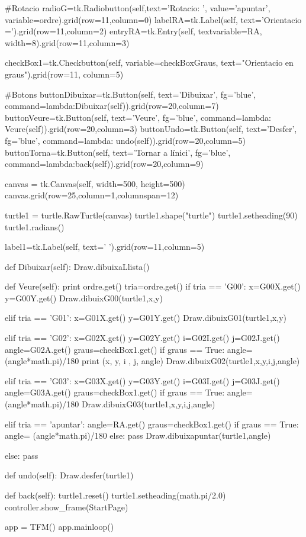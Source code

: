 \begin{python}
			
			
			
			
			#Rotacio
			radioG=tk.Radiobutton(self,text='Rotacio: ', value='apuntar', variable=ordre).grid(row=11,column=0)
			labelRA=tk.Label(self, text='Orientacio =').grid(row=11,column=2)
			entryRA=tk.Entry(self, textvariable=RA, width=8).grid(row=11,column=3)
			
			checkBox1=tk.Checkbutton(self, variable=checkBoxGraus, text="Orientacio en graus").grid(row=11, column=5)
			
			
			
			#Botons
			buttonDibuixar=tk.Button(self, text='Dibuixar', fg='blue', command=lambda:Dibuixar(self)).grid(row=20,column=7)
			buttonVeure=tk.Button(self, text='Veure', fg='blue', command=lambda: Veure(self)).grid(row=20,column=3)
			buttonUndo=tk.Button(self, text='Desfer', fg='blue', command=lambda: undo(self)).grid(row=20,column=5)
			buttonTorna=tk.Button(self, text='Tornar a l\'inici', fg='blue', command=lambda:back(self)).grid(row=20,column=9)
			
			canvas = tk.Canvas(self, width=500, height=500)
			canvas.grid(row=25,column=1,columnspan=12)
			
			turtle1 = turtle.RawTurtle(canvas)
			turtle1.shape("turtle")
			turtle1.setheading(90)
			turtle1.radians()
			
			label1=tk.Label(self, text='          ').grid(row=11,column=5)
			
			
			
			
			def Dibuixar(self):
				Draw.dibuixaLlista()
			
			
			def Veure(self):
				print ordre.get()
				tria=ordre.get()
				if tria == 'G00':
					x=G00X.get()
					y=G00Y.get()
					Draw.dibuixG00(turtle1,x,y)
				
				elif tria == 'G01':
					x=G01X.get()
					y=G01Y.get()
					Draw.dibuixG01(turtle1,x,y)
				
				elif tria == 'G02':
					x=G02X.get()
					y=G02Y.get()
					i=G02I.get()
					j=G02J.get()
					angle=G02A.get()
					graus=checkBox1.get()
					if graus == True:
						angle= (angle*math.pi)/180
					print (x, y, i , j, angle)
					Draw.dibuixG02(turtle1,x,y,i,j,angle)
				
				elif tria == 'G03':
					x=G03X.get()
					y=G03Y.get()
					i=G03I.get()
					j=G03J.get()
					angle=G03A.get()
					graus=checkBox1.get()
					if graus == True:
						angle= (angle*math.pi)/180 
					Draw.dibuixG03(turtle1,x,y,i,j,angle)
				
				elif tria == 'apuntar':
					angle=RA.get()
					graus=checkBox1.get()
					if graus == True:
						angle= (angle*math.pi)/180
					else:
						pass
					Draw.dibuixapuntar(turtle1,angle)
				
				else:
					pass
			
			def undo(self):
				Draw.desfer(turtle1)
			
			
			def back(self):
				turtle1.reset()
				turtle1.setheading(math.pi/2.0)
				controller.show_frame(StartPage)
	
	
	
	app = TFM()
	app.mainloop()
	
\end{python}

